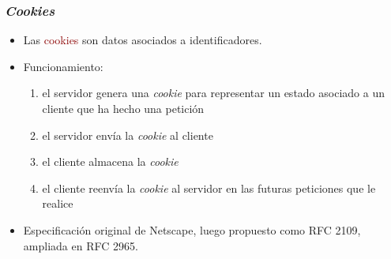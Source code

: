 \documentclass[hyperref={pdfpagelabels=true},ucs]{beamer}
\newcommand{\res}[1]{\textcolor{darkred}{#1}}
\begin{document}
\begin{frame}
\frametitle{\emph{Cookies}}

\begin{itemize}
\item Las \res{cookies} son datos asociados a identificadores.

\item Funcionamiento:

  \begin{enumerate}
  \item el servidor genera una \emph{cookie} para representar un
    estado asociado a un cliente que ha hecho una petición
  \item el servidor envía la \emph{cookie} al cliente
  \item el cliente almacena la \emph{cookie}
  \item el cliente reenvía la \emph{cookie} al servidor en las
    futuras peticiones que le realice
  \end{enumerate}

\item Especificación original de Netscape, luego propuesto como RFC
  2109, ampliada en RFC 2965.
\end{itemize}

\end{frame}

\end{document}
